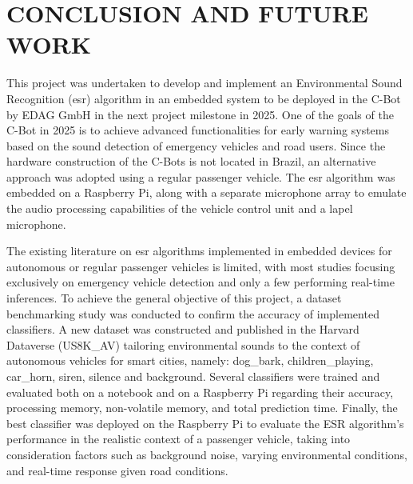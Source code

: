 \chapter{CONCLUSION AND FUTURE WORK}
\label{chp:conclusion}

This project was undertaken to develop and implement an Environmental Sound Recognition (\gls{esr}) algorithm in an embedded system to be deployed in the C-Bot by EDAG GmbH in the next project milestone in 2025. One of the goals of the C-Bot in 2025 is to achieve advanced functionalities for early warning systems based on the sound detection of emergency vehicles and road users. Since the hardware construction of the C-Bots is not located in Brazil, an alternative approach was adopted using a regular passenger vehicle. The \gls{esr} algorithm was embedded on a Raspberry Pi, along with a separate microphone array to emulate the audio processing capabilities of the vehicle control unit and a lapel microphone.

The existing literature on \gls{esr} algorithms implemented in embedded devices for autonomous or regular passenger vehicles is limited, with most studies focusing exclusively on emergency vehicle detection and only a few performing real-time inferences. To achieve the general objective of this project, a dataset benchmarking study was conducted to confirm the accuracy of implemented classifiers. A new dataset was constructed and published in the Harvard Dataverse (US8K\_AV) tailoring environmental sounds to the context of autonomous vehicles for smart cities, namely: dog\_bark, children\_playing, car\_horn, siren, silence and background. Several classifiers were trained and evaluated both on a notebook and on a Raspberry Pi regarding their accuracy, processing memory, non-volatile memory, and total prediction time. Finally, the best classifier was deployed on the Raspberry Pi to evaluate the ESR algorithm's performance in the realistic context of a passenger vehicle, taking into consideration factors such as background noise, varying environmental conditions, and real-time response given road conditions.



